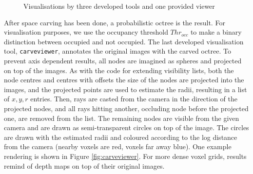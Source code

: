 \begin{figure}[htb!]
{ }
 \caption{Visualisations by three developed tools and one provided viewer}
 \label{fig:visualisationtools}
\end{figure}

\clearpage
After space carving has been done, a probabilistic octree is the result. For visualisation purposes, we use the occupancy threshold $Thr_{occ}$ to make a binary distinction between occupied and not occupied. The last developed visualisation tool, \texttt{carveviewer}, annotates the original images with the carved octree. To prevent axis dependent results, all nodes are imagined as spheres and projected on top of the images. As with the code for extending visibility lists, both the node centres and centres with offsets the size of the nodes are projected into the images, and the projected points are used to estimate the radii, resulting in a list of $x,y,r$ entries. Then, rays are casted from the camera in the direction of the projected nodes, and all rays hitting another, occluding node before the projected one, are removed from the list. The remaining nodes are visible from the given camera and are drawn as semi-transparent circles on top of the image. The circles are drawn with the estimated radii and coloured according to the log distance from the camera (nearby voxels are red, voxels far away blue). One example rendering is shown in Figure \ref{fig:carveviewer}. For more dense voxel grids, results remind of depth maps on top of their original images. 

